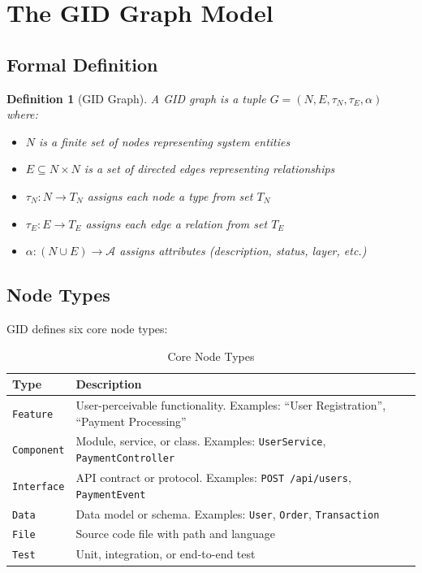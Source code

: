 \documentclass[11pt,a4paper]{article}
\newtheorem{definition}{Definition}
\begin{document}
\section{The GID Graph Model}

\subsection{Formal Definition}

\begin{definition}[GID Graph]
A GID graph is a tuple $G = (N, E, \tau_N, \tau_E, \alpha)$ where:
\begin{itemize}[noitemsep]
    \item $N$ is a finite set of nodes representing system entities
    \item $E \subseteq N \times N$ is a set of directed edges representing relationships
    \item $\tau_N: N \rightarrow T_N$ assigns each node a type from set $T_N$
    \item $\tau_E: E \rightarrow T_E$ assigns each edge a relation from set $T_E$
    \item $\alpha: (N \cup E) \rightarrow \mathcal{A}$ assigns attributes (description, status, layer, etc.)
\end{itemize}
\end{definition}

\subsection{Node Types}

GID defines six core node types:

\begin{table}[h]
\centering
\caption{Core Node Types}
\begin{tabular}{@{}lp{8cm}@{}}
\toprule
\textbf{Type} & \textbf{Description} \\
\midrule
\texttt{Feature} & User-perceivable functionality. Examples: ``User Registration'', ``Payment Processing'' \\
\texttt{Component} & Module, service, or class. Examples: \texttt{UserService}, \texttt{PaymentController} \\
\texttt{Interface} & API contract or protocol. Examples: \texttt{POST /api/users}, \texttt{PaymentEvent} \\
\texttt{Data} & Data model or schema. Examples: \texttt{User}, \texttt{Order}, \texttt{Transaction} \\
\texttt{File} & Source code file with path and language \\
\texttt{Test} & Unit, integration, or end-to-end test \\
\bottomrule
\end{tabular}
\end{table}
\end{document}
